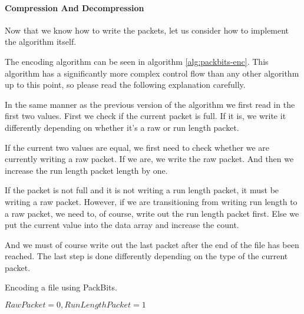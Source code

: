 \begin{refsection}
\paragraph{Compression And Decompression}
\label{sec:compr-decompr}

Now that we know how to write the packets, let us consider how to
implement the algorithm itself.

The encoding algorithm can be seen in algorithm
\ref{alg:packbits-enc}. This algorithm has a significantly more
complex control flow than any other algorithm up to this point, so please
read the following explanation carefully.

In the same manner as the previous version of the algorithm we first
read in the first two values. First we check if the current packet is
full. If it is, we write it differently depending on whether it's a
raw or run length packet.

If the current two values are equal, we first need to check whether we
are currently writing a raw packet. If we are, we write the raw
packet. And then we increase the run length packet length by one.

If the packet is not full and it is not writing a run length packet,
it must be writing a raw packet. However, if we are transitioning from
writing run length to a raw packet, we need to, of course, write out
the run length packet first. Else we put the current value into the
data array and increase the count.

And we must of course write out the last packet after the end of the
file has been reached. The last step is done differently depending on
the type of the current packet. 

\begin{algorithm}
  \caption{Encoding a file using PackBits.}
  \label{alg:packbits-enc}
  \begin{algorithmic}[1]
    \Require $RawPacket = 0,RunLengthPacket = 1$


    \While{\neof}


            \State {}


\end{algorithmic}
\end{algorithm}
\end{refsection}
